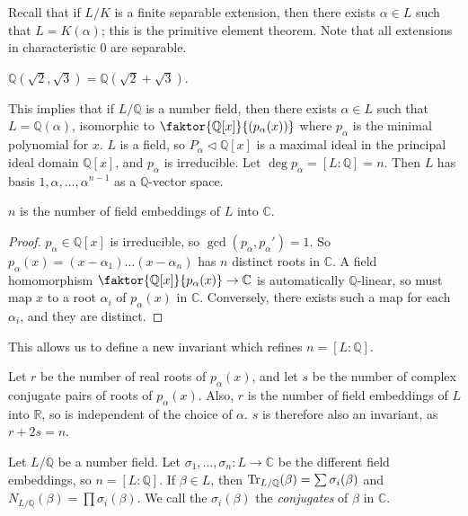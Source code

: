 Recall that if \( L / K \) is a finite separable extension, then there exists \( \alpha \in L \) such that \( L = K(\alpha) \); this is the primitive element theorem.
Note that all extensions in characteristic 0 are separable.
\begin{example}
    \( \mathbb Q(\sqrt 2, \sqrt 3) = \mathbb Q(\sqrt 2 + \sqrt 3) \).
\end{example}
This implies that if \( L / \mathbb Q \) is a number field, then there exists \( \alpha \in L \) such that \( L = \mathbb Q(\alpha) \), isomorphic to \( \faktor{\mathbb Q[x]}{(p_\alpha(x))} \) where \( p_\alpha \) is the minimal polynomial for \( x \).
\( L \) is a field, so \( P_\alpha \triangleleft \mathbb Q[x] \) is a maximal ideal in the principal ideal domain \( \mathbb Q[x] \), and \( p_\alpha \) is irreducible.
Let \( \deg p_\alpha = [L:\mathbb Q] = n \).
Then \( L \) has basis \( 1, \alpha, \dots, \alpha^{n-1} \) as a \( \mathbb Q \)-vector space.
\begin{lemma}
    \( n \) is the number of field embeddings of \( L \) into \( \mathbb C \).
\end{lemma}
\begin{proof}
    \( p_\alpha \in \mathbb Q[x] \) is irreducible, so \( \gcd(p_\alpha, p_\alpha') = 1 \).
    So \( p_\alpha(x) = (x-\alpha_1)\dots(x-\alpha_n) \) has \( n \) distinct roots in \( \mathbb C \).
    A field homomorphism \( \faktor{\mathbb Q[x]}{p_\alpha(x)} \to \mathbb C \) is automatically \( \mathbb Q \)-linear, so must map \( x \) to a root \( \alpha_i \) of \( p_\alpha(x) \) in \( \mathbb C \).
    Conversely, there exists such a map for each \( \alpha_i \), and they are distinct.
\end{proof}
This allows us to define a new invariant which refines \( n = [L:\mathbb Q] \).
\begin{definition}
    Let \( r \) be the number of real roots of \( p_\alpha(x) \), and let \( s \) be the number of complex conjugate pairs of roots of \( p_\alpha(x) \).
    Also, \( r \) is the number of field embeddings of \( L \) into \( \mathbb R \), so is independent of the choice of \( \alpha \).
    \( s \) is therefore also an invariant, as \( r + 2s = n \).
\end{definition}
\begin{lemma}
    Let \( L / \mathbb Q \) be a number field.
    Let \( \sigma_1, \dots, \sigma_n \colon L \to \mathbb C \) be the different field embeddings, so \( n = [L:\mathbb Q]\).
    If \( \beta \in L \), then \( \Tr_{L/\mathbb Q}(\beta) = \sum \sigma_i(\beta) \) and \( N_{L/\mathbb Q}(\beta) = \prod \sigma_i(\beta) \).
    We call the \( \sigma_i(\beta) \) the \emph{conjugates} of \( \beta \) in \( \mathbb C \).
\end{lemma}
